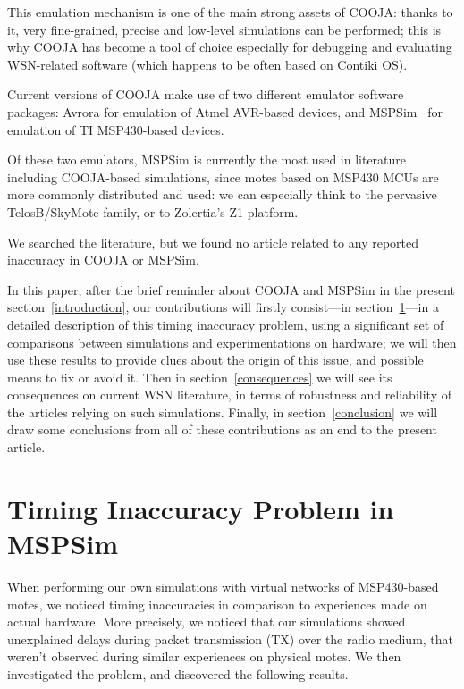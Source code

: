 \documentclass[10pt]{ewsn-proc}
\begin{document}
This emulation mechanism is one of the main strong assets of COOJA:
thanks to it, very fine-grained, precise and low-level simulations
can be performed; this is why COOJA has become a tool of choice especially
for debugging and evaluating WSN-related software (which happens to be
often based on Contiki OS).

Current versions of COOJA make use of two different emulator software
packages: Avrora for emulation of Atmel AVR-based devices, and
MSPSim~\cite{MSPSim} for emulation of TI MSP430-based devices.

Of these two emulators, MSPSim is currently the most used in literature
including COOJA-based simulations, since motes based on MSP430 MCUs are
more commonly distributed and used: we can especially think to the pervasive
TelosB/SkyMote family, or to Zolertia's Z1 platform.

We searched the literature, but we found no article related to any reported
inaccuracy in COOJA or MSPSim.

In this paper, after the brief reminder about COOJA and MSPSim in the
present section~\ref{introduction}, our contributions will firstly
consist---in section~\ref{results}---in a detailed description of this
timing inaccuracy problem, using a significant set of comparisons between
simulations and experimentations on hardware; we will then use these results
to provide clues about the origin of this issue, and possible means to fix
or avoid it.
Then in section~\ref{consequences} we will see its consequences on current
WSN literature, in terms of robustness and reliability of the articles
relying on such simulations. Finally, in section~\ref{conclusion}
we will draw some conclusions from all of these contributions as an end
to the present article.



\section{Timing Inaccuracy Problem in MSPSim}
\label{results}

When performing our own simulations with virtual networks of MSP430-based
motes, we noticed timing inaccuracies in comparison to experiences made
on actual hardware. More precisely, we noticed that our simulations showed
unexplained delays during packet transmission (TX) over the radio medium,
that weren't observed during similar experiences on physical motes.
We then investigated the problem, and discovered the following results.
\end{document}
